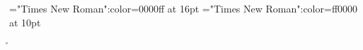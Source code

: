 \font\ba="Times New Roman":color=0000ff at 16pt
\font\a="Times New Roman":color=ff0000 at 10pt
 \r\n
{}

\ba{}



\bye
